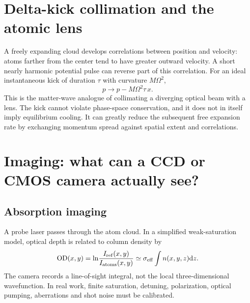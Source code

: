 \documentclass[11pt,a4paper]{article}
\newcommand{\dd}{\mathrm d}
\begin{document}
\section{Delta-kick collimation and the atomic lens}
A freely expanding cloud develops correlations between position and velocity: atoms farther from the center tend to have greater outward velocity. A short nearly harmonic potential pulse can reverse part of this correlation. For an ideal instantaneous kick of duration $\tau$ with curvature $M\Omega^2$,
\begin{equation}p\longrightarrow p-M\Omega^2\tau\,x.\end{equation}
This is the matter-wave analogue of collimating a diverging optical beam with a lens. The kick cannot violate phase-space conservation, and it does not in itself imply equilibrium cooling. It can greatly reduce the subsequent free expansion rate by exchanging momentum spread against spatial extent and correlations.

\begin{center}\end{center}

\section{Imaging: what can a CCD or CMOS camera actually see?}
\subsection{Absorption imaging}
A probe laser passes through the atom cloud. In a simplified weak-saturation model, optical depth is related to column density by
\begin{equation}\mathrm{OD}(x,y)=\ln\!\frac{I_{\rm ref}(x,y)}{I_{\rm atoms}(x,y)}\simeq\sigma_{\rm eff}\int n(x,y,z)\dd z.\end{equation}
The camera records a line-of-sight integral, not the local three-dimensional wavefunction. In real work, finite saturation, detuning, polarization, optical pumping, aberrations and shot noise must be calibrated.
\end{document}

